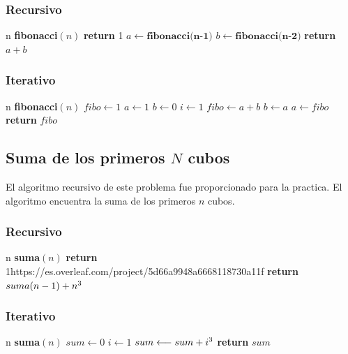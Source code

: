 \documentclass[12pt,twoside]{article}
\begin{document}
\subsubsection{Recursivo}
\begin{algorithmic}
    \Require n
    \State \textbf{fibonacci}$(n)$
        \State \textbf{return} 1
    \Else
        \State $a \longleftarrow \textbf{fibonacci(n-1)}$
        \State $b \longleftarrow \textbf{fibonacci(n-2)}$
        \State \textbf{return} $a+b$
    \EndIf
\end{algorithmic}
\subsubsection{Iterativo}
\begin{algorithmic}
    \Require n
    \State \textbf{fibonacci}$(n)$
    \State $fibo\longleftarrow1$
    \State $a\longleftarrow1$
    \State $b\longleftarrow0$
    \State $i\longleftarrow1$
        \State $fibo\longleftarrow a+b$
        \State $b\longleftarrow a$
        \State $a\longleftarrow fibo$
    \EndFor
    \State \textbf{return} $fibo$
\end{algorithmic}

\subsection{Suma de los primeros $N$ cubos}
El algoritmo recursivo de este problema fue proporcionado para la practica. El algoritmo encuentra la suma de los primeros $n$ cubos.
\subsubsection{Recursivo}
\begin{algorithmic}
    \Require n
    \State \textbf{suma}$(n)$
        \State \textbf{return} 1https://es.overleaf.com/project/5d66a9948a6668118730a11f
    \Else
        \State \textbf{return} $suma(n-1)+n\textsuperscript{3}$
    \EndIf
\end{algorithmic}
\subsubsection{Iterativo}
\begin{algorithmic}
    \Require n
    \State \textbf{suma}$(n)$
    \State $sum \longleftarrow 0$
    \State $i \longleftarrow1$
        \State $sum \longleftarrow sum + i\textsuperscript{3}$
    \EndFor
    \State \textbf{return} $sum$
\end{algorithmic}
\end{document}

